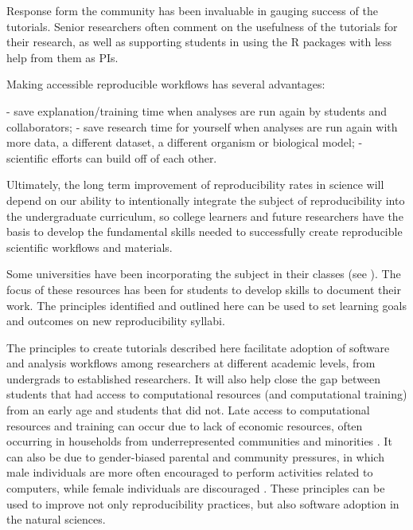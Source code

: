 \documentclass[12pt]{article}
\begin{document}
Response form the community has been invaluable in gauging success of the tutorials.
Senior researchers often comment on the usefulness
of the tutorials for their research, as well as supporting students in using the
R packages with less help from them as PIs.

Making accessible reproducible workflows has several advantages:

- save explanation/training time when analyses are run again by students and collaborators;
- save research time for yourself when analyses are run again with more data, a
  different dataset, a different organism or biological model;
- scientific efforts can build off of each other.


Ultimately, the long term improvement of reproducibility rates in science will depend
on our ability to intentionally integrate the subject of reproducibility into the
undergraduate curriculum, so college learners and future researchers have the
basis to develop the fundamental skills needed to successfully create reproducible
scientific workflows and materials.

Some universities have been incorporating the subject in their classes (see
\cite{uwlibraries2022, nigms2022}).
The focus of these resources has been for students to develop skills to document their work.
The principles identified and outlined here can be used to set learning goals and
outcomes on new reproducibility syllabi.

The principles to create tutorials described here facilitate adoption of software
 and analysis workflows among researchers at different academic levels, from undergrads
  to established researchers.
It will also help close the gap between students that had access to computational
resources (and computational training) from an early age and students that did not.
Late access to computational resources and training can occur due to lack of
economic resources, often occurring in households from underrepresented communities
and minorities \citep{REFERENCE-NEEDED}.
It can also be due to gender-biased parental and community pressures,
in which male individuals are more often encouraged to perform activities related to computers,
while female individuals are discouraged \citep{REFERENCE-NEEDED}.
These principles can be used to improve not only reproducibility practices,
 but also software adoption in the natural sciences.
\end{document}
